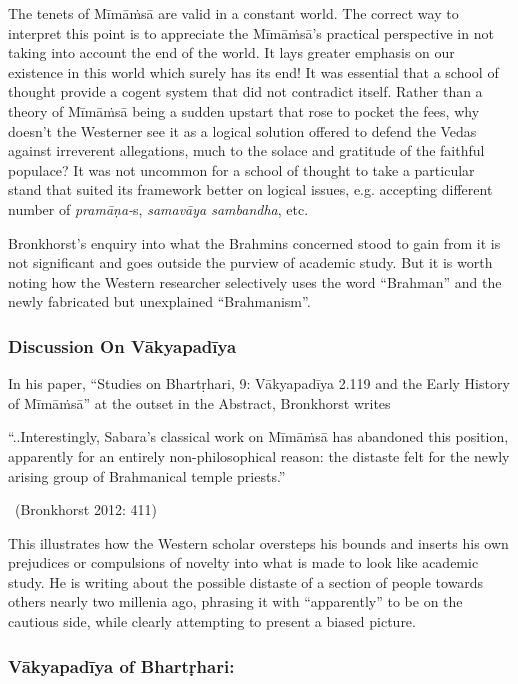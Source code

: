 The tenets of Mīmāṁsā are valid in a constant world. The correct way to interpret this point is to appreciate the Mīmāṁsā’s practical perspective in not taking into account the end of the world. It lays greater emphasis on our existence in this world which surely has its end! It was essential that a school of thought provide a cogent system that did not contradict itself. Rather than a theory of Mīmāṁsā being a sudden upstart that rose to pocket the fees, why doesn’t the Westerner see it as a logical solution offered to defend the Vedas against irreverent allegations, much to the solace and gratitude of the faithful populace? It was not uncommon for a school of thought to take a particular stand that suited its framework better on logical issues, e.g. accepting different number of \textit{pramāṇa-}s, \textit{samavāya sambandha}, etc.

Bronkhorst’s enquiry into what the Brahmins concerned stood to gain from it is not significant and goes outside the purview of academic study. But it is worth noting how the Western researcher selectively uses the word “Brahman” and the newly fabricated but unexplained “Brahmanism”.

\subsubsection*{Discussion On Vākyapadīya}

In his paper, “Studies on Bhartṛhari, 9: Vākyapadīya 2.119 and the Early History of Mīmāṁsā” at the outset in the Abstract, Bronkhorst writes

\begin{myquote}
“..Interestingly, Sabara’s classical work on Mīmāṁsā has abandoned this position, apparently for an entirely non-philosophical reason: the distaste felt for the newly arising group of Brahmanical temple priests.” 

~\hfill (Bronkhorst 2012: 411)
\end{myquote}

This illustrates how the Western scholar oversteps his bounds and inserts his own prejudices or compulsions of novelty into what is made to look like academic study. He is writing about the possible distaste of a section of people towards others nearly two millenia ago, phrasing it with “apparently” to be on the cautious side, while clearly attempting to present a biased picture.


\subsubsection*{Vākyapadīya of Bhartṛhari:}

